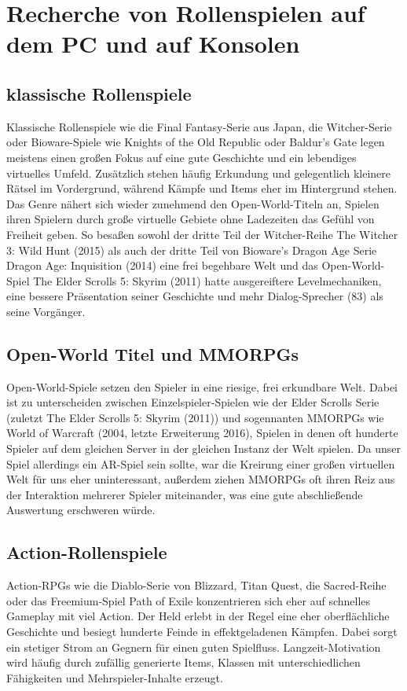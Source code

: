\documentclass[extern,palatino]{cgBA}
\begin{document}
\section{Recherche von Rollenspielen auf dem PC und auf Konsolen}
\subsection{klassische Rollenspiele}
Klassische Rollenspiele wie die Final Fantasy-Serie aus Japan, die Witcher-Serie oder Bioware-Spiele wie Knights of the Old Republic oder Baldur's Gate legen meistens einen großen Fokus auf eine gute Geschichte und ein lebendiges virtuelles Umfeld. Zusätzlich stehen häufig Erkundung und gelegentlich kleinere Rätsel im Vordergrund, während Kämpfe und Items eher im Hintergrund stehen. 
\\Das Genre nähert sich wieder zunehmend den Open-World-Titeln an, Spielen ihren Spielern durch große virtuelle Gebiete ohne Ladezeiten das Gefühl von Freiheit geben. So besaßen sowohl der dritte Teil der Witcher-Reihe The Witcher 3: Wild Hunt (2015) als auch der dritte Teil von Bioware's Dragon Age Serie Dragon Age: Inquisition (2014) eine frei begehbare Welt und das Open-World-Spiel The Elder Scrolls 5: Skyrim (2011) hatte ausgereiftere Levelmechaniken, eine bessere Präsentation seiner Geschichte und mehr Dialog-Sprecher (83) als seine Vorgänger. %
\subsection{Open-World Titel und MMORPGs}
Open-World-Spiele setzen den Spieler in eine riesige, frei erkundbare Welt. Dabei ist zu unterscheiden zwischen Einzelspieler-Spielen wie der Elder Scrolls Serie (zuletzt The Elder Scrolls 5: Skyrim (2011)) und sogennanten MMORPGs wie World of Warcraft (2004, letzte Erweiterung 2016), Spielen in denen oft hunderte Spieler auf dem gleichen Server in der gleichen Instanz der Welt spielen. Da unser Spiel allerdings ein AR-Spiel sein sollte, war die Kreirung einer großen virtuellen Welt für uns eher uninteressant, außerdem ziehen MMORPGs oft ihren Reiz aus der Interaktion mehrerer Spieler miteinander, was eine gute abschließende Auswertung erschweren würde.
\subsection{Action-Rollenspiele}
Action-RPGs wie die Diablo-Serie von Blizzard, Titan Quest, die Sacred-Reihe oder das Freemium-Spiel Path of Exile konzentrieren sich eher auf schnelles Gameplay mit viel Action. Der Held erlebt in der Regel eine eher oberflächliche Geschichte und besiegt hunderte Feinde in effektgeladenen Kämpfen. Dabei sorgt ein stetiger Strom an Gegnern für einen guten Spielfluss. Langzeit-Motivation wird häufig durch zufällig generierte Items, Klassen mit unterschiedlichen Fähigkeiten und Mehrspieler-Inhalte erzeugt.
\end{document}
